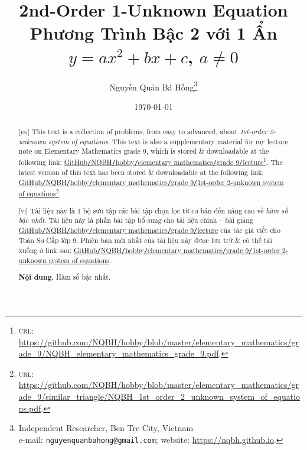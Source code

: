 \documentclass{article}
\title{2nd-Order 1-Unknown Equation\\Phương Trình Bậc 2 với 1 Ẩn $y = ax^2 + bx + c$, $a\ne0$}
\author{Nguyễn Quản Bá Hồng\footnote{Independent Researcher, Ben Tre City, Vietnam\\e-mail: \texttt{nguyenquanbahong@gmail.com}; website: \url{https://nqbh.github.io}.}}
\date{\today}
\begin{document}
\maketitle
\begin{abstract}
	\textsc{[en]} This text is a collection of problems, from easy to advanced, about \textit{1st-order 2-unknown system of equations}. This text is also a supplementary material for my lecture note on Elementary Mathematics grade 9, which is stored \& downloadable at the following link: \href{https://github.com/NQBH/hobby/blob/master/elementary_mathematics/grade_9/NQBH_elementary_mathematics_grade_9.pdf}{GitHub\texttt{/}NQBH\texttt{/}hobby\texttt{/}elementary mathematics\texttt{/}grade 9\texttt{/}lecture}\footnote{\textsc{url}: \url{https://github.com/NQBH/hobby/blob/master/elementary_mathematics/grade_9/NQBH_elementary_mathematics_grade_9.pdf}.}. The latest version of this text has been stored \& downloadable at the following link: \href{https://github.com/NQBH/hobby/blob/master/elementary_mathematics/grade_9/1st_order_2_unknown_system_of_equations/NQBH_1st_order_2_unknown_system_of_equations.pdf}{GitHub\texttt{/}NQBH\texttt{/}hobby\texttt{/}elementary mathematics\texttt{/}grade 9\texttt{/}1st-order 2-unknown system of equations}\footnote{\textsc{url}: \url{https://github.com/NQBH/hobby/blob/master/elementary_mathematics/grade_9/similar_triangle/NQBH_1st_order_2_unknown_system_of_equations.pdf}.}.
	\vspace{2mm}
	
	\textsc{[vi]} Tài liệu này là 1 bộ sưu tập các bài tập chọn lọc từ cơ bản đến nâng cao về \textit{hàm số bậc nhất}. Tài liệu này là phần bài tập bổ sung cho tài liệu chính -- bài giảng \href{https://github.com/NQBH/hobby/blob/master/elementary_mathematics/grade_9/NQBH_elementary_mathematics_grade_9.pdf}{GitHub\texttt{/}NQBH\texttt{/}hobby\texttt{/}elementary mathematics\texttt{/}grade 9\texttt{/}lecture} của tác giả viết cho Toán Sơ Cấp lớp 9. Phiên bản mới nhất của tài liệu này được lưu trữ \& có thể tải xuống ở link sau: \href{https://github.com/NQBH/hobby/blob/master/elementary_mathematics/grade_9/1st_order_2_unknown_system_of_equations/NQBH_1st_order_2_unknown_system_of_equations.pdf}{GitHub\texttt{/}NQBH\texttt{/}hobby\texttt{/}elementary mathematics\texttt{/}grade 9\texttt{/}1st-order 2-unknown system of equations}.
	
	\textsf{\textbf{Nội dung.} Hàm số bậc nhất.}
\end{abstract}
\tableofcontents
\newpage

\end{document}
